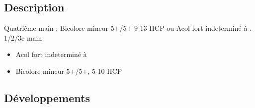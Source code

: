 \documentclass[a4paper]{article}
\begin{document}
\subsection{Description}

Quatrième main : Bicolore mineur 5+/5+ 9-13 HCP ou Acol fort indeterminé à \s . 1/2/3e main

\begin{itemize}
\item Acol fort indeterminé à \s\ 

\item Bicolore mineur 5+/5+, 5-10 HCP

\end{itemize}

\subsection{Développements}
\end{document}

